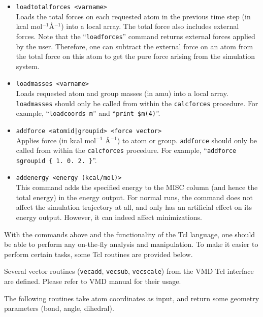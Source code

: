 \begin{itemize}
\item
{\tt loadtotalforces <varname>} \\
Loads the total forces on each requested atom in the previous
time step (in kcal mol$^{-1}$\AA$^{-1}$) into a local array. The
total force also includes external forces. Note that the
``{\tt loadforces}'' command returns external forces applied by
the user. Therefore, one can subtract the external force on an
atom from the total force on this atom to get the pure force
arising from the simulation system.

\item
{\tt loadmasses <varname>} \\
Loads requested atom and group masses (in amu) into a local array.
{\tt loadmasses} should only be called from within the {\tt calcforces} procedure.
For example, ``{\tt loadcoords m}'' and ``{\tt print \$m(4)}''.

\item
{\tt addforce <atomid|groupid> <force vector>} \\
Applies force (in kcal mol$^{-1}$ \AA$^{-1}$) to atom or group.
{\tt addforce} should only be called from within the {\tt calcforces} procedure.
For example, ``\verb!addforce $groupid { 1. 0. 2. }!''.

\item
{\tt addenergy <energy (kcal/mol)>} \\
This command adds the specified energy to the MISC column (and
hence the total energy) in the energy output. For normal runs,
the command does not affect the simulation trajectory at all, and
only has an artificial effect on its energy output. However, it
can indeed affect minimizations.

\end{itemize}

With the commands above and the functionality of the Tcl language,
one should be able to perform any on-the-fly analysis and
manipulation. To make it easier to perform certain tasks,
some Tcl routines are provided below.

Several vector routines ({\tt vecadd}, {\tt vecsub}, {\tt vecscale})
from the VMD Tcl interface are defined. Please refer to VMD
manual for their usage.

The following routines take atom coordinates as input, and return
some geometry parameters (bond, angle, dihedral).

